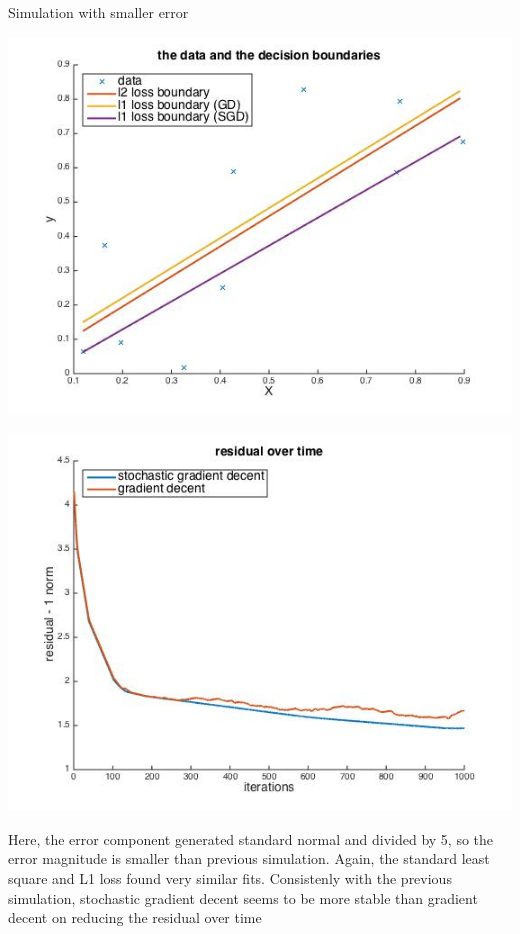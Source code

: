 \documentclass[paper=a4, fontsize=11pt]{scrartcl} %
\numberwithin{equation}{section} %
\numberwithin{figure}{section} %
\numberwithin{table}{section} %
\begin{document}
\newpage
Simulation with smaller error 
\begin{center}
\includegraphics[scale=.5]{hw7_2a_smer_fit.jpg}
\end{center}
\begin{center}
\includegraphics[scale=.5]{hw7_2a_smer_gdsgd.jpg}
\end{center}

Here, the error component generated standard normal and divided by 5, so the error magnitude is smaller than previous simulation. Again, the standard least square and L1 loss found very similar fits. Consistenly with the previous simulation, stochastic gradient decent seems to be more stable than gradient decent on reducing the residual over time
\end{document}
